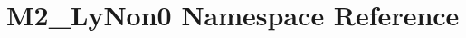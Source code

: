 \hypertarget{namespaceM2__LyNon0}{}\section{M2\+\_\+\+Ly\+Non0 Namespace Reference}
\label{namespaceM2__LyNon0}
